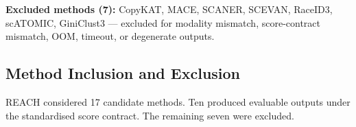 \documentclass[10pt]{article}
\providecommand{\DIFaddtex}[1]{{\protect\color{trackgreen}#1}} %
\providecommand{\DIFaddFL}[1]{\DIFadd{#1}} %
\providecommand{\DIFadd}[1]{\texorpdfstring{\DIFaddtex{#1}}{#1}} %
\begin{document}
\textbf{\DIFaddFL{Excluded methods (7):}} \DIFaddFL{CopyKAT, MACE, SCANER, SCEVAN, RaceID3,
scATOMIC, GiniClust3 --- excluded for modality mismatch, score-contract
mismatch, OOM, timeout, or degenerate outputs.
}

\begin{center}\DIFaddFL{\rule{0.5\linewidth}{0.5pt}}\end{center}

\subsection{\DIFaddFL{Method Inclusion and
Exclusion}}\label{method-inclusion-and-exclusion}

\DIFaddFL{REACH considered 17 candidate methods. Ten produced evaluable outputs
under the standardised score contract. The remaining seven were
excluded.
}
\end{document}
